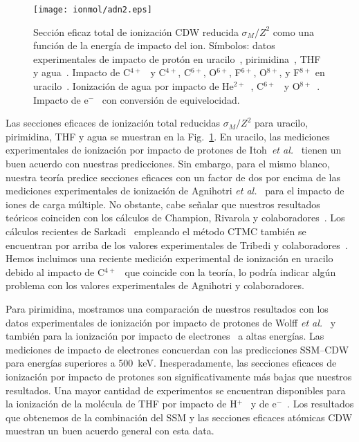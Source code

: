 \begin{figure}
\centering
\texttt{[image: ionmol/adn2.eps]}
\caption[Sección eficaz total de ionización reducida por $Z$ (Parte II).]
{Sección eficaz total de ionización CDW reducida $\sigma_{M}/Z^2$ como 
una función de la energía de impacto del ion. Símbolos: datos 
experimentales de impacto de protón en uracilo~\cite{itoh2013}, 
pirimidina~\cite{wolff2014}, THF~\cite{wang2016} y agua~\cite{Luna2007,
Bolorizadeh86,H_Rudd85,toburen80}. Impacto de C$^{4+}$~\cite{Sens:20} y 
C$^{4+}$, C$^{6+}$, O$^{6+}$, F$^{6+}$, O$^{8+}$, y F$^{8+}$ en 
uracilo~\cite{agnihotri2012,agnihotri2013}. Ionización de agua por 
impacto de He$^{2+}$~\cite{Ohsawa05,He_Rudd85,toburen80}, 
C$^{6+}$~\cite{DalCappello2009,Bhattacharjee:17} y 
O$^{8+}$~\cite{Bhattacharjee:16}. 
Impacto de e$^-$~\cite{bug2017,wolf2019,fuss2009} con conversión de 
equivelocidad.}
\label{fig:crossDNA_2}
\end{figure} 

Las secciones eficaces de ionización total reducidas $\sigma_M/Z^2$ 
para uracilo, pirimidina, THF y agua se muestran en la 
Fig.~\ref{fig:crossDNA_2}. En uracilo, las mediciones experimentales de 
ionización por impacto de protones de Itoh~\textit{et al.}~\cite{itoh2013} 
tienen un buen acuerdo con nuestras predicciones. Sin embargo, para el 
mismo blanco, nuestra teoría predice secciones eficaces con un factor 
de dos por encima de las mediciones experimentales de ionización de 
Agnihotri \textit{et al.}~\cite{agnihotri2012,agnihotri2013} para el 
impacto de iones de carga múltiple. No obstante, cabe señalar que 
nuestros resultados teóricos coinciden con los cálculos de Champion, 
Rivarola y colaboradores~\cite{agnihotri2012,champion2012}. Los cálculos 
recientes de Sarkadi~\cite{sarkadi2016} empleando el método CTMC también 
se encuentran por arriba de los valores experimentales de Tribedi y 
colaboradores~\cite{agnihotri2012,agnihotri2013}. Hemos incluimos una 
reciente medición experimental de ionización en uracilo debido al impacto 
de C$^{4+}$~\cite{Sens:20} que coincide con la teoría, lo podría indicar 
algún problema con los valores experimentales de Agnihotri y 
colaboradores.

Para pirimidina, mostramos una comparación de nuestros resultados con 
los datos experimentales de ionización por impacto de protones de 
Wolff \textit{et al.}~\cite{wolff2014} y también para la ionización por 
impacto de electrones~\cite{bug2017} a altas energías. Las mediciones de 
impacto de electrones concuerdan con las predicciones SSM--CDW para 
energías superiores a 500~keV. Inesperadamente, las secciones eficaces de 
ionización por impacto de protones son significativamente más bajas que 
nuestros resultados. Una mayor cantidad de experimentos se encuentran 
disponibles para la ionización de la molécula de THF por impacto de 
H$^+$~\cite{wang2016} y de e$^-$~\cite{bug2017,wolf2019,fuss2009}. Los 
resultados que obtenemos de la combinación del SSM y las secciones 
eficaces atómicas CDW muestran un buen acuerdo general con esta data.

